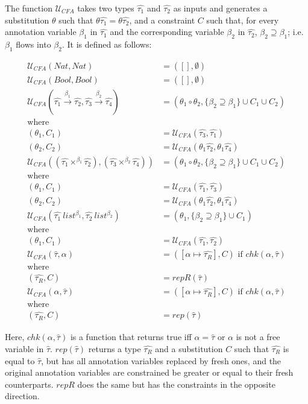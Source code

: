 \documentclass[a4paper,11pt]{article}
\newcommand{\bigU}{\ensuremath{\mathcal{U}_{CFA}}\xspace}
\begin{document}
The function \bigU takes two types $\hat{\tau_1}$ and $\hat{\tau_2}$ as inputs and generates a substitution $\theta$ such that $\theta\hat{\tau_1} = \theta \hat{\tau_2}$, and a constraint $C$ such that, for every annotation variable $\beta_1$ in $\hat{\tau_1}$ and the corresponding variable $\beta_2$ in $\hat{\tau_2}$, $\beta_2 \supseteq \beta_1$; i.e. $\beta_1$ flows into $\beta_2$. It is defined as follows:

\begin{align*}
\bigU (Nat, Nat) &= ([], \emptyset) \\
\bigU (Bool, Bool) &= ([], \emptyset) \\
\bigU (\hat{\tau_1} \xrightarrow{\beta_1} \hat{\tau_2}, \hat{\tau_3} \xrightarrow{\beta_2} \hat{\tau_4}) &= (\theta_1 \circ \theta_2, \{\beta_2 \supseteq \beta_1\} \cup C_1 \cup C_2)\\
\text{where}\\
(\theta_1,C_1) &= \bigU (\hat{\tau_3},\hat{\tau_1})\\
(\theta_2,C_2) &= \bigU (\theta_1\hat{\tau_2},\theta_1\hat{\tau_4})\\
\bigU ((\hat{\tau_1} \times^{\beta_1} \hat{\tau_2}),(\hat{\tau_3} \times^{\beta_2} \hat{\tau_4})) &= (\theta_1 \circ  \theta_2, \{\beta_2 \supseteq \beta_1\} \cup C_1 \cup C_2)\\
\text{where}\\
(\theta_1,C_1) &= \bigU (\hat{\tau_1},\hat{\tau_3})\\
(\theta_2,C_2) &= \bigU (\theta_1\hat{\tau_2},\theta_1\hat{\tau_4})\\
\bigU (\hat{\tau_1} ~ list^{\beta_1}, \hat{\tau_2} ~ list^{\beta_2}) &= (\theta_1, \{\beta_2 \supseteq \beta_1\} \cup C_1)\\
\text{where}\\
(\theta_1, C_1) &= \bigU (\hat{\tau_1}, \hat{\tau_2})\\
\bigU (\hat{\tau}, \alpha) &= ([\alpha \mapsto \hat{\tau_R}], C)\text{ if }chk(\alpha, \hat{\tau})\\
\text{where}\\
(\hat{\tau_R}, C) &= repR(\hat{\tau})\\
\bigU (\alpha, \hat{\tau}) &= ([\alpha \mapsto \hat{\tau_R}], C)\text{ if }chk (\alpha, \hat{\tau})\\
\text{where}\\
(\hat{\tau_R}, C) &= rep(\hat{\tau}) 
\end{align*}

Here, $chk (\alpha, \hat{\tau})$ is a function that returns true iff $\alpha = \hat{\tau}$ or $\alpha$ is not a free variable in $\hat{\tau}$.
$rep (\hat{\tau})$ returns a type $\hat{\tau_R}$ and a substitution $C$ such that $\hat{\tau_R}$ is equal to $\hat{\tau}$, but has all annotation variables replaced by fresh ones, and the original annotation variables are constrained be greater or equal to their fresh counterparts. $repR$ does the same but has the constraints in the opposite direction.
\end{document}
